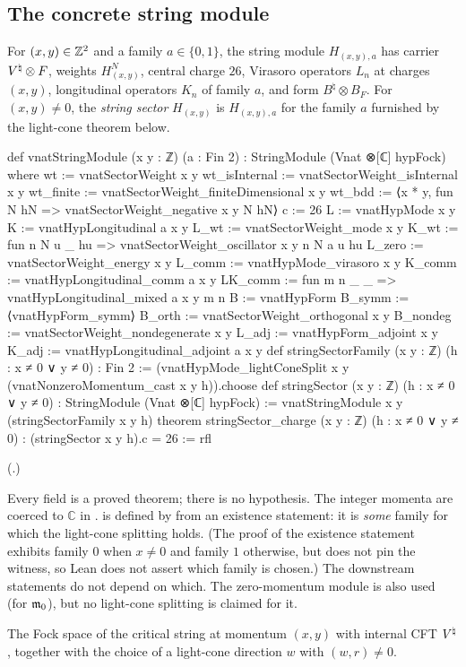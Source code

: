 \subsection{The concrete string module}

\begin{definition}\label{ch18:def:vnatstringmodule}
For $(x,y)\in{\mathbb{Z}}^2$ and a family $a\in\{0,1\}$, the string module $H_{(x,y),a}$ has carrier
${V^{\natural}}\otimes F$, weights $H^N_{(x,y)}$, central charge $26$, Virasoro operators $L_n$ at charges $(x,y)$, longitudinal
operators $K_n$ of family $a$, and form $B^\natural\otimes B_F$.  For $(x,y)\neq0$, the \emph{string sector}
$H_{(x,y)}$ is $H_{(x,y),a}$ for the family $a$ furnished by the light-cone theorem below.
\end{definition}
\begin{leancode}
def vnatStringModule (x y : ℤ) (a : Fin 2) : StringModule (Vnat ⊗[ℂ] hypFock) where
  wt := vnatSectorWeight x y
  wt_isInternal := vnatSectorWeight_isInternal x y
  wt_finite := vnatSectorWeight_finiteDimensional x y
  wt_bdd := ⟨x * y, fun N hN => vnatSectorWeight_negative x y N hN⟩
  c := 26
  L := vnatHypMode x y
  K := vnatHypLongitudinal a x y
  L_wt := vnatSectorWeight_mode x y
  K_wt := fun n N u _ hu => vnatSectorWeight_oscillator x y n N a u hu
  L_zero := vnatSectorWeight_energy x y
  L_comm := vnatHypMode_virasoro x y
  K_comm := vnatHypLongitudinal_comm a x y
  LK_comm := fun m n _ _ => vnatHypLongitudinal_mixed a x y m n
  B := vnatHypForm
  B_symm := ⟨vnatHypForm_symm⟩
  B_orth := vnatSectorWeight_orthogonal x y
  B_nondeg := vnatSectorWeight_nondegenerate x y
  L_adj := vnatHypForm_adjoint x y
  K_adj := vnatHypLongitudinal_adjoint a x y
def stringSectorFamily (x y : ℤ) (h : x ≠ 0 ∨ y ≠ 0) : Fin 2 :=
  (vnatHypMode_lightConeSplit x y (vnatNonzeroMomentum_cast x y h)).choose
def stringSector (x y : ℤ) (h : x ≠ 0 ∨ y ≠ 0) :
    StringModule (Vnat ⊗[ℂ] hypFock) := vnatStringModule x y (stringSectorFamily x y h)
theorem stringSector_charge (x y : ℤ) (h : x ≠ 0 ∨ y ≠ 0) :
    (stringSector x y h).c = 26 := rfl
\end{leancode}
(.)
\begin{dictionary}
Every field is a proved theorem; there is no hypothesis.  The integer momenta are coerced to $\mathbb C$
in .   is defined by  from an existence
statement: it is \emph{some} family for which the light-cone splitting holds.  (The proof of the existence statement
exhibits family $0$ when $x\neq0$ and family $1$ otherwise, but  does not pin the witness, so Lean does not
assert which family is chosen.)  The downstream statements do not depend on which.  The zero-momentum
module  is also used (for $\mathfrak{m}_0$), but no light-cone splitting is claimed for it.
\end{dictionary}
\begin{physics}
The Fock space of the critical string at momentum $(x,y)$ with internal CFT ${V^{\natural}}$, together with the
choice of a light-cone direction $w$ with $(w,r)\neq0$.
\end{physics}

